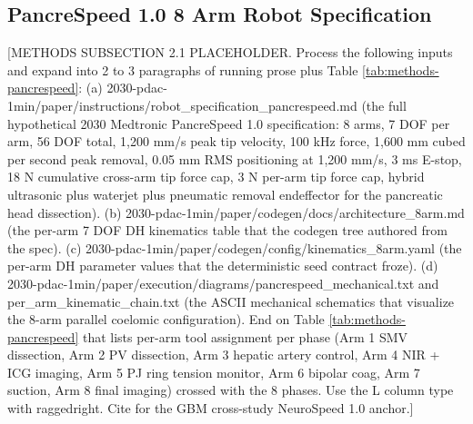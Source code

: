 %

\subsection{PancreSpeed 1.0 8 Arm Robot Specification}
\label{sec:methods-robot}

[METHODS SUBSECTION 2.1 PLACEHOLDER. Process the following inputs and expand into 2 to 3 paragraphs of running prose plus Table \ref{tab:methods-pancrespeed}:
(a) 2030-pdac-1min/paper/instructions/robot_specification_pancrespeed.md (the full hypothetical 2030 Medtronic PancreSpeed 1.0 specification: 8 arms, 7 DOF per arm, 56 DOF total, 1,200 mm/s peak tip velocity, 100 kHz force, 1,600 mm cubed per second peak removal, 0.05 mm RMS positioning at 1,200 mm/s, 3 ms E-stop, 18 N cumulative cross-arm tip force cap, 3 N per-arm tip force cap, hybrid ultrasonic plus waterjet plus pneumatic removal endeffector for the pancreatic head dissection).
(b) 2030-pdac-1min/paper/codegen/docs/architecture_8arm.md (the per-arm 7 DOF DH kinematics table that the codegen tree authored from the spec).
(c) 2030-pdac-1min/paper/codegen/config/kinematics_8arm.yaml (the per-arm DH parameter values that the deterministic seed contract froze).
(d) 2030-pdac-1min/paper/execution/diagrams/pancrespeed_mechanical.txt and per_arm_kinematic_chain.txt (the ASCII mechanical schematics that visualize the 8-arm parallel coelomic configuration).
End on Table \ref{tab:methods-pancrespeed} that lists per-arm tool assignment per phase (Arm 1 SMV dissection, Arm 2 PV dissection, Arm 3 hepatic artery control, Arm 4 NIR + ICG imaging, Arm 5 PJ ring tension monitor, Arm 6 bipolar coag, Arm 7 suction, Arm 8 final imaging) crossed with the 8 phases. Use the L column type with raggedright. Cite \cite{kawchak_2026_20113157} for the GBM cross-study NeuroSpeed 1.0 anchor.]


